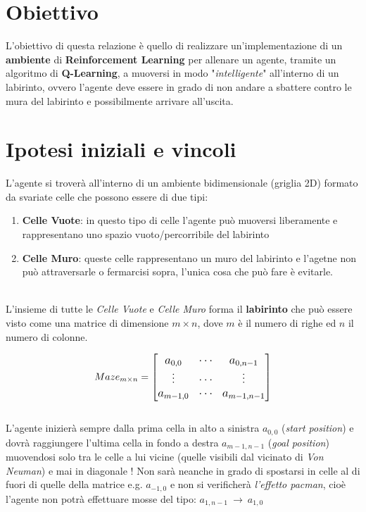 \section{Obiettivo}
L'obiettivo di questa relazione \`{e} quello di realizzare un'implementazione di un \textbf{ambiente} di \textbf{Reinforcement Learning} per allenare un agente, tramite un algoritmo di \textbf{Q-Learning}, a muoversi in modo "\textit{intelligente}" all'interno di un labirinto, ovvero l'agente deve essere in grado di non andare a sbattere contro le mura del labirinto e possibilmente arrivare all'uscita.

\section{Ipotesi iniziali e vincoli}
L'agente si trover\`{a} all'interno di un ambiente bidimensionale (griglia 2D) formato da svariate celle che possono essere di due tipi:

\begin{enumerate}
	\item \textbf{Celle Vuote}: in questo tipo di celle l'agente pu\`{o} muoversi liberamente e rappresentano uno spazio vuoto/percorribile del labirinto
	\item \textbf{Celle Muro}: queste celle rappresentano un muro del labirinto e l'agetne non pu\`{o} attraversarle o fermarcisi sopra, l'unica cosa che pu\`{o} fare \`{e} evitarle.
\end{enumerate}
\ \\
L'insieme di tutte le \textit{Celle Vuote} e \textit{Celle Muro} forma il \textbf{labirinto} che pu\`{o} essere visto come una matrice di dimensione $m \times n$, dove $m$ \`{e} il numero di righe ed $n$ il numero di colonne.

\begin{equation*}
\large
Maze_{m \times n}=
\begin{bmatrix}
a_{0,0} & \cdots & a_{0,n-1} \\
\vdots & \cdots & \vdots \\
a_{m-1,0} & \cdots & a_{m-1,n-1}
\end{bmatrix}
\end{equation*}
\ \\
L'agente inizier\`{a} sempre dalla prima cella in alto a sinistra $a_{0,0}$ (\textit{start position}) e dovr\`{a} raggiungere l'ultima cella in fondo a destra $a_{m-1,n-1}$ (\textit{goal position})  muovendosi solo tra le celle a lui vicine (quelle visibili dal vicinato di \textit{Von Neuman}) e mai in diagonale ! Non sar\`{a} neanche in grado di spostarsi in celle al di fuori di quelle della matrice e.g. $a_{-1, 0}$ e non si verificher\`{a} \textit{l'effetto pacman}, cio\`{e} l'agente non potr\`{a} effettuare mosse del tipo: $ a_{1,n-1} \ \rightarrow \ a_{1, 0}$

